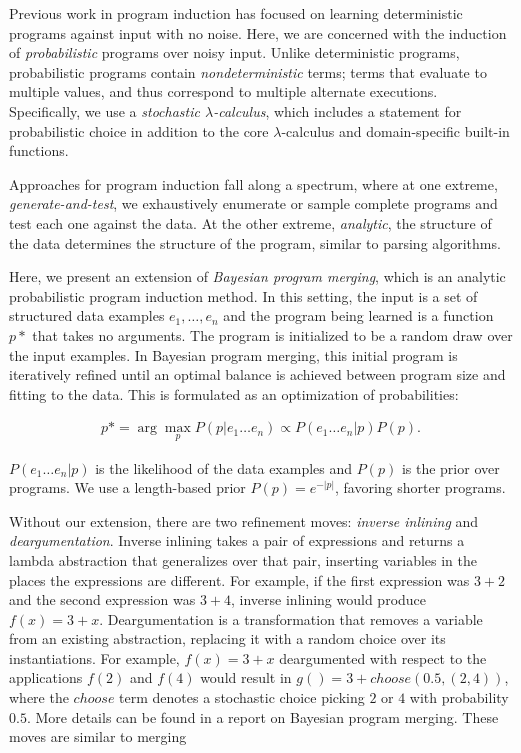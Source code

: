 \documentclass{acmsiggraph}
\begin{document}
Previous work in program induction has 
focused on learning deterministic programs
against input with no noise.
Here, we are concerned with the induction of \emph{probabilistic} programs
over noisy input.
Unlike deterministic programs, probabilistic programs contain \emph{nondeterministic} terms;
terms that evaluate to multiple values,
and thus correspond to multiple alternate executions.
Specifically, we use a \emph{stochastic $\lambda$-calculus},
which includes a statement for probabilistic choice
in addition to the core $\lambda$-calculus
and domain-specific built-in functions.

Approaches for program induction fall along a spectrum,
where at one extreme, \emph{generate-and-test},
we exhaustively enumerate or sample complete programs
and test each one against the data.
At the other extreme, \emph{analytic},
the structure of the data
determines the structure of the program,
similar to parsing algorithms.

Here, we present an extension of \emph{Bayesian program merging},
which is an analytic probabilistic program induction method.
In this setting, the input is a set of structured data examples
$e_1, \ldots, e_n$
and the program being learned is a function $p*$ that takes no arguments.
The program is initialized to be a random draw over the input examples.
In Bayesian program merging, this initial program is iteratively refined
until an optimal balance is achieved between program size and fitting to the data.
This is formulated as an optimization of probabilities:

\begin{align*}
p* = \arg \max_{p} P(p | e_1 \ldots e_n) \propto P(e_1 \ldots e_n | p) P(p).
\end{align*}

$P(e_1 \ldots e_n | p)$ is the likelihood of the data examples and 
$P(p)$ is the prior over programs.
We use a length-based prior $P(p) = e^{-|p|}$, favoring shorter programs.

Without our extension, there are two refinement moves:
\emph{inverse inlining} and \emph{deargumentation}.
Inverse inlining takes a pair of expressions and
returns a lambda abstraction that generalizes over that pair,
inserting variables in the places the expressions are different.
For example, if the first expression was $3 + 2$ and the second expression was $3 + 4$,
inverse inlining would produce $f(x) = 3 + x$.
Deargumentation is a transformation that removes a variable from an existing abstraction,
replacing it with a random choice over its instantiations.
For example, $f(x) = 3 + x$ deargumented with respect to the applications $f(2)$ and $f(4)$
would result in $g() = 3 + choose(0.5, (2, 4))$,
where the $choose$ term denotes a stochastic choice picking $2$ or $4$ with probability $0.5$.
More details can be found in a report on Bayesian program merging\cite{}.
These moves are similar to merging 
\end{document}
